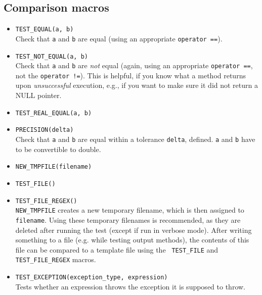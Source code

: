 \documentclass[a4paper,10pt]{article}
\begin{document}
\subsection{Comparison macros}
\begin{itemize}
	\item {\tt TEST\_EQUAL(a, b)}\\
		Check that {\tt a} and {\tt b} are equal (using an appropriate {\tt operator ==}).

	\item {\tt TEST\_NOT\_EQUAL(a, b)}\\
		Check that {\tt a} and {\tt b} are \emph{not} equal (again, using an
		appropriate {\tt operator ==}, not the {\tt operator !=}). This is helpful, if
		you know what a method returns upon \emph{unsuccessful} execution, e.g.,
		if you want to make sure it did not return a NULL pointer.

	\item {\tt TEST\_REAL\_EQUAL(a, b)}
	\item{\tt PRECISION(delta)}\\
		Check that {\tt a} and {\tt b} are equal within a tolerance {\tt delta},
		defined. {\tt a} and {\tt b} have to be convertible to double.

	\item{\tt NEW\_TMPFILE(filename)}\\
	\item{\tt TEST\_FILE()}\\
	\item{\tt TEST\_FILE\_REGEX()}\\
		{\tt NEW\_TMPFILE} creates a new temporary filename, which is then assigned
		to {\tt filename}. Using these temporary filenames is recommended, as they
		are deleted after running the test (except if run in verbose mode).
		After writing something to a file (e.g. while testing output methods), the
		contents of this file can be compared to a template file using the {\tt
		TEST\_FILE} and {\tt TEST\_FILE\_REGEX} macros.

	\item {\tt TEST\_EXCEPTION(exception\_type, expression)}\\
		Tests whether an expression throws the exception it is supposed to throw.
	
	
\end{itemize}
\end{document}
